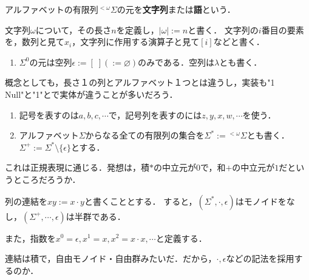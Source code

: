 \documentclass[uplatex, dvipdfmx]{jsreport}
\begin{document}
\begin{definition}
    アルファベットの有限列${}^{<\omega}\Sigma$の元を\textbf{文字列}または\textbf{語}という．

    文字列$\omega$について，その長さ$n$を定義し，$|\omega|:=n$と書く．
    文字列の$i$番目の要素を，数列と見て$x_i$，文字列に作用する演算子と見て$[i]$などと書く．
\end{definition}
\begin{example}\mbox{}
    \begin{enumerate}
        \item $\Sigma^0$の元は空列$\epsilon:=[\;](:=\varnothing)$のみである．空列は$\lambda$とも書く．
    \end{enumerate}
\end{example}
\begin{remark}
    概念としても，長さ１の列とアルファベット１つとは違うし，実装も"1 Null"と"1"とで実体が違うことが多いだろう．
\end{remark}
\begin{notation}\mbox{}
    \begin{enumerate}
        \item 記号を表すのは$a,b,c,\cdots$で，記号列を表すのには$z,y,x,w,\cdots$を使う．
        \item アルファベット$\Sigma$からなる全ての有限列の集合を$\Sigma^*:={}^{<\omega}\Sigma$とも書く．
        $\Sigma^+:=\Sigma^*\setminus\{\epsilon\}$とする．
    \end{enumerate}
\end{notation}
\begin{remark}
    これは正規表現に通じる．発想は，積$*$の中立元が$0$で，和$+$の中立元が$1$だというところだろうか．
\end{remark}

\begin{definition}[concatenation]
    列の連結を$xy:=x\cdot y$と書くこととする．
    すると，$(\Sigma^*,\cdot,\epsilon)$はモノイドをなし，$(\Sigma^+,\cdots,\epsilon)$は半群である．

    また，指数を$x^0=\epsilon,x^1=x,x^2=x\cdot x,\cdots$と定義する．
\end{definition}
\begin{remark}
    連結は積で，自由モノイド・自由群みたいだ．だから，$\cdot,\epsilon$などの記法を採用するのか．
\end{remark}
\end{document}
